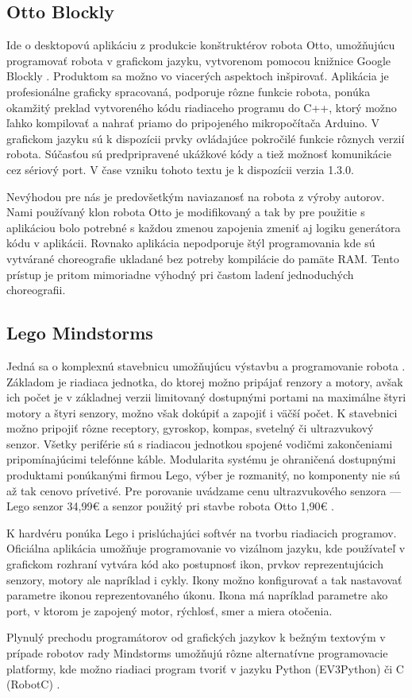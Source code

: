 \subsection{Otto Blockly}
\label{sub:OttoBlockly}
Ide o desktopovú aplikáciu z produkcie konštruktérov robota Otto, umožňujúcu programovať robota v grafickom jazyku, vytvorenom pomocou knižnice Google Blockly \cite{OttoBlockly}. Produktom sa možno vo viacerých aspektoch inšpirovať. Aplikácia je profesionálne graficky spracovaná, podporuje rôzne funkcie robota, ponúka okamžitý preklad vytvoreného kódu riadiaceho programu do C++, ktorý možno ľahko kompilovať a nahrať priamo do pripojeného mikropočítača Arduino. V grafickom jazyku sú k dispozícii prvky ovládajúce pokročilé funkcie rôznych verzií robota. Súčasťou sú predpripravené ukážkové kódy a tiež možnosť komunikácie cez sériový port. V čase vzniku tohoto textu je k dispozícii verzia 1.3.0.

Nevýhodou pre nás je predovšetkým naviazanosť na robota z výroby autorov. Nami používaný klon robota Otto je modifikovaný a tak by pre použitie s aplikáciou bolo potrebné s každou zmenou zapojenia zmeniť aj logiku generátora kódu v aplikácii. Rovnako aplikácia nepodporuje štýl programovania kde sú vytvárané choreografie ukladané bez potreby kompilácie do pamäte RAM. Tento prístup je pritom mimoriadne výhodný pri častom ladení jednoduchých choreografii. 

\subsection{Lego Mindstorms}
\label{sub:LegoMindstorms}
Jedná sa o komplexnú stavebnicu umožňujúcu výstavbu a programovanie robota \cite{LegoMindstormsEducationSet}. Základom je riadiaca jednotka, do ktorej možno pripájať renzory a motory, avšak ich počet je v základnej verzii limitovaný dostupnými portami na maximálne štyri motory a štyri senzory, možno však dokúpiť  a zapojiť i väčší počet. K stavebnici možno pripojiť rôzne receptory, gyroskop, kompas, svetelný či ultrazvukový senzor. Všetky periférie sú s riadiacou jednotkou spojené vodičmi zakončeniami pripomínajúcimi telefónne káble. Modularita systému je ohraničená dostupnými produktami ponúkanými firmou Lego, výber je rozmanitý, no komponenty nie sú až tak cenovo prívetivé. Pre porovanie uvádzame cenu ultrazvukového senzora --- Lego senzor 34,99€ \cite{LegoMindstormsUltrasonic} a senzor použitý pri stavbe robota Otto 1,90€ \cite{OttoUltrasonic}.

K hardvéru ponúka Lego i prislúchajúci softvér na tvorbu riadiacich programov. Oficiálna aplikácia umožňuje programovanie vo vizálnom jazyku, kde používateľ v grafickom rozhraní vytvára kód ako postupnosť ikon, prvkov reprezentujúcich senzory, motory ale napríklad i cykly. Ikony možno konfigurovať a tak nastavovať parametre ikonou reprezentovaného úkonu. Ikona  má napríklad parametre ako port, v ktorom je zapojený motor, rýchlosť, smer a miera otočenia.

Plynulý prechodu programátorov od grafických jazykov k bežným textovým v prípade robotov rady Mindstorms umožňujú rôzne alternatívne programovacie platformy, kde možno riadiaci program tvoriť v jazyku Python (EV3Python) či C (RobotC) \cite{LegoAlternatives}.









